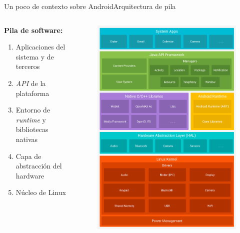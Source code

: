 \documentclass[pdf]{beamer} %
\begin{document}
\begin{frame}{Un poco de contexto sobre Android}{Arquitectura de pila}
    \begin{columns}
        \begin{column}{.6\textwidth}
            \textbf{Pila de software:} \pause
            \begin{enumerate}[<+->]
                \item Aplicaciones del sistema y de terceros
                \item \textit{API} de la plataforma
                \item Entorno de \textit{runtime} y bibliotecas nativas
                \item Capa de abstracción del hardware
                \item Núcleo de Linux
            \end{enumerate}
        \end{column}

        \begin{column}{.4\textwidth}
            \begin{figure}
                \includegraphics[scale=0.09]{../imagenes/android-stack.png}
            \end{figure}
        \end{column}
    \end{columns}
\end{frame}
\end{document}
